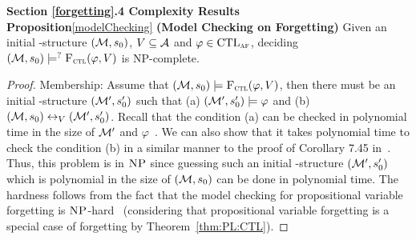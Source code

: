 \documentclass{article}
\begin{document}
 \noindent\textbf{Section \ref{forgetting}.4 Complexity Results}
\\

\noindent \textbf{Proposition}\ref{modelChecking}  \textbf{(Model Checking on Forgetting)}  Given an initial \MPK-structure $({\cal M},s_0)$, $V\subseteq{\cal A}$ and $\varphi \in \textrm{CTL}_{\textsc{a}\textsc{f}}$,  deciding $({\cal M},s_0) \models^? {\textsc{F}_{\textsc{ctl}}}(\varphi, V)$ is \textsc{NP}-complete.
\begin{proof}
Membership:
Assume that $({\cal M},s_0)\models{\textsc{F}_{\textsc{ctl}}}(\varphi, V )$, then
there must be an initial \MPK-structure $({\cal M}', s_0')$ such that (a) $({\cal M}', s_0')\models\varphi$ and
(b) $({\cal M}, s_0) \leftrightarrow_V ({\cal M}', s_0')$. Recall that the condition (a) can be checked in polynomial time in the size of ${\cal M}'$ and $\varphi$~\cite{DBLP:books/daglib/0007403}. We can also show that it takes polynomial time to check the condition (b) in a similar manner to the proof of Corollary 7.45 in~\cite{Baier:PMC:2008}. Thus, this problem is in $\textsc{NP}$ since guessing such an initial \MPK-structure $({\cal M}', s_0')$ which is polynomial in the size of $({\cal M},s_0)$ can be done in polynomial time.
The hardness follows from the fact that the model checking for propositional variable
forgetting is $\textsc{NP}$-hard~\cite{Zhang2008Properties} (considering that propositional variable
forgetting is a special case of forgetting by Theorem~\ref{thm:PL:CTL}).



\end{proof}
\end{document}
